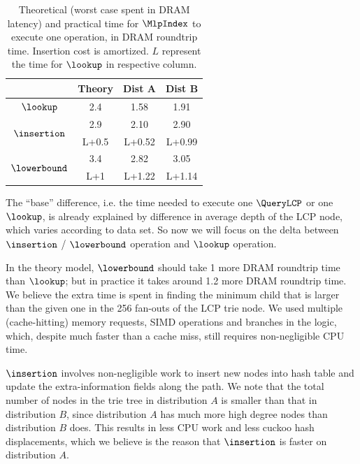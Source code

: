 \documentclass[11pt, usletter]{article}
\begin{document}
\begin{table}[]
\centering
\begin{tabular}{|c|c|c|c|}
\hline
                             & Theory                      & Dist A                      & Dist B                      \\ \hline
$\lookup$                      & 2.4                         & 1.58                        & 1.91                        \\ \hline
\multirow{2}{*}{$\insertion$}  & 2.9                         & 2.10                        & 2.90                        \\ \cline{2-4} 
                             & L+0.5                      & L+0.52                      & L+0.99                      \\ \hline
\multirow{2}{*}{$\lowerbound$} & 3.4                         & 2.82                        & 3.05                        \\ \cline{2-4} 
                             & \multicolumn{1}{c|}{L+1} & \multicolumn{1}{c|}{L+1.22} & \multicolumn{1}{c|}{L+1.14} \\ \hline
\end{tabular}
\caption{Theoretical (worst case spent in DRAM latency) and practical time for $\MlpIndex$ to execute one operation, in DRAM roundtrip time.
Insertion cost is amortized. $L$ represent the time for $\lookup$ in respective column.}
\label{mlpindex_theory_practice}
\end{table}

The ``base'' difference, i.e. the time needed to execute one $\QueryLCP$ or one $\lookup$, 
is already explained by difference in average depth of the LCP node, which varies according to data set. 
So now we will focus on the delta between $\insertion$ / $\lowerbound$ operation and $\lookup$ operation.

In the theory model, $\lowerbound$ should take 1 more DRAM roundtrip time than $\lookup$; 
but in practice it takes around 1.2 more DRAM roundtrip time. 
We believe the extra time is spent in finding the minimum child that is larger than the given one in the 256 fan-outs of the LCP trie node. 
We used multiple (cache-hitting) memory requests, SIMD operations and branches in the logic, 
which, despite much faster than a cache miss, still requires non-negligible CPU time.

$\insertion$ involves non-negligible work to insert new nodes into hash table and update the extra-information fields along the path. 
We note that the total number of nodes in the trie tree in distribution $A$ is smaller than that in distribution $B$, 
since distribution $A$ has much more high degree nodes than distribution $B$ does.
This results in less CPU work and less cuckoo hash displacements, which we believe is the reason that $\insertion$ is faster on distribution $A$.
\end{document}
